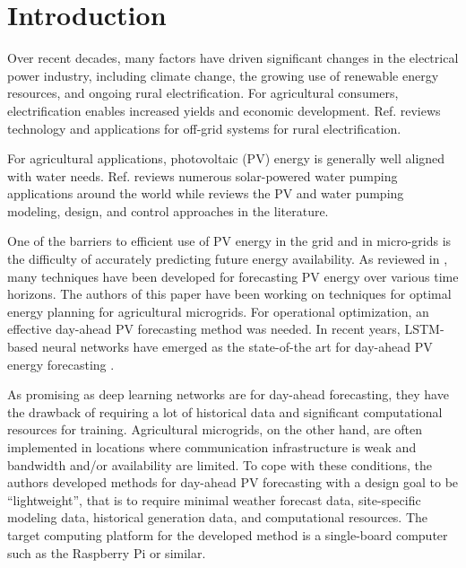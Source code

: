 \section{Introduction}
\label{sec:intro}

Over recent decades, many factors have driven significant changes in the electrical power industry,
including climate change,
the growing use of renewable energy resources,
and ongoing rural electrification.
For agricultural consumers, electrification enables increased yields and economic development.
Ref. \cite{Mandelli2016} reviews technology and applications for off-grid systems for rural electrification.

For agricultural applications, photovoltaic (PV) energy is generally well aligned with water needs\cite{Aliyu2018}.
Ref. \cite{Aliyu2018} reviews numerous solar-powered water pumping applications around the world while \cite{Muhsen2017} reviews the PV and water pumping modeling, design, and control approaches in the literature.

One of the barriers to efficient use of PV energy in the grid and in micro-grids
is the difficulty of accurately predicting future energy availability.
As reviewed in \cite{Antonanzas2016}, many techniques have been developed for forecasting PV energy over various time horizons.
The authors of this paper have been working on techniques for optimal energy planning for agricultural microgrids.
For operational optimization, an effective day-ahead PV forecasting method was needed.
In recent years, LSTM-based neural networks have emerged as the state-of-the art
for day-ahead PV energy forecasting
\cite{Kuo2022,Aslam2021,Liu2021}.

As promising as deep learning networks are for day-ahead forecasting,
they have the drawback of requiring 
a lot of historical data\cite{Aillaud2020} and significant computational resources for training.
Agricultural microgrids, on the other hand, are often implemented in locations where communication infrastructure is weak
and bandwidth and/or availability are limited.
To cope with these conditions, the authors developed methods for day-ahead PV forecasting with a design goal to be ``lightweight'', that is to require minimal weather forecast data, site-specific modeling data, historical generation data, and computational resources.
The target computing platform for the developed method is a single-board computer such as the Raspberry Pi or similar.
